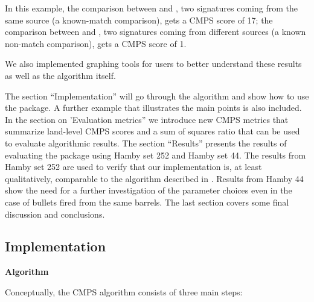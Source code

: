 In this example, the comparison between  and , two
signatures coming from the same source (a known-match comparison), gets
a CMPS score of 17; the comparison between  and ,
two signatures coming from different sources (a known non-match
comparison), gets a CMPS score of 1.

We also implemented graphing tools for users to better understand these
results as well as the algorithm itself.

The section ``Implementation'' will go through the algorithm and show
how to use the  package. A further example that illustrates
the main points is also included. In the section on 'Evaluation
metrics'' we introduce new CMPS metrics that summarize land-level CMPS
scores and a sum of squares ratio that can be used to evaluate
algorithmic results. The section ``Results'' presents the results of
evaluating the  package using Hamby set 252 and Hamby set 44.
The results from Hamby set 252 are used to verify that our
implementation is, at least qualitatively, comparable to the algorithm
described in \citet{cmps}. Results from Hamby 44 show the need for a
further investigation of the parameter choices even in the case of
bullets fired from the same barrels. The last section covers some final
discussion and conclusions.

\hypertarget{implementation}{%
\subsection{Implementation}\label{implementation}}

\textbf{Algorithm}

Conceptually, the CMPS algorithm consists of three main steps:

